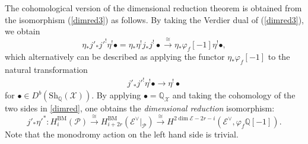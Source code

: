 \documentclass [11pt,oneside,a4paper,mathscr]{amsart}
\theoremstyle{definition}
\newcommand{\X}{\mathscr{X}}
\begin{document}
The cohomological version of the dimensional 
reduction theorem is obtained from the 
isomorphism (\ref{dimred3}) as follows. 
By taking the Verdier dual of (\ref{dimred3}), we obtain 
\begin{equation}\label{dimred}
\eta_*j'_*j'^!\eta^!\bullet=
\eta_*\eta^!j_*j^!\bullet \xrightarrow{\cong} 
\eta_*\varphi_f[-1]\eta^!\bullet,
\end{equation} 
which alternatively can be described as applying the functor $\eta_*\varphi_f[-1]$ to the natural transformation \begin{align*}j'_*j'^!\eta^!\bullet\to \eta^!\bullet
\end{align*}
for $\bullet\in D^b(\mathrm{Sh}_{\mathbb{Q}}(\X))$.
% 
By applying $\bullet=\mathbb{Q}_{\X}$ and 
taking the cohomology of the two sides in \eqref{dimred}, one obtains the \textit{dimensional reduction} isomorphism: 
\begin{equation}\label{dimred2}
j'_*\eta'^*\colon H^{\mathrm{BM}}_i(\mathscr{P})\xrightarrow{\cong} 
H^{\mathrm{BM}}_{i+2r}(\mathscr{E}^\vee|_\mathscr{P})\xrightarrow{\cong}
H^{2\dim \mathscr{E}-2r-i}(\mathscr{E}^\vee, \varphi_f\mathbb{Q}[-1]).
\end{equation}
Note that the monodromy action 
on the left hand side is trivial. 
\end{document}
